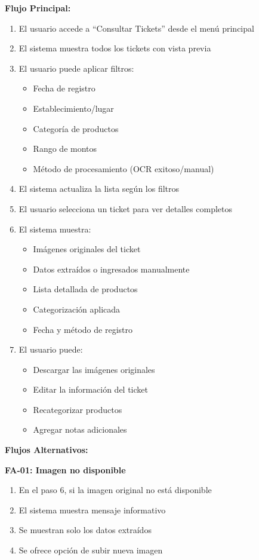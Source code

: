 \noindent\textbf{Flujo Principal:}
\begin{enumerate}
    \item El usuario accede a ``Consultar Tickets'' desde el menú principal
    \item El sistema muestra todos los tickets con vista previa
    \item El usuario puede aplicar filtros:
    \begin{itemize}
        \item Fecha de registro
        \item Establecimiento/lugar
        \item Categoría de productos
        \item Rango de montos
        \item Método de procesamiento (OCR exitoso/manual)
    \end{itemize}
    \item El sistema actualiza la lista según los filtros
    \item El usuario selecciona un ticket para ver detalles completos
    \item El sistema muestra:
    \begin{itemize}
        \item Imágenes originales del ticket
        \item Datos extraídos o ingresados manualmente
        \item Lista detallada de productos
        \item Categorización aplicada
        \item Fecha y método de registro
    \end{itemize}
    \item El usuario puede:
    \begin{itemize}
        \item Descargar las imágenes originales
        \item Editar la información del ticket
        \item Recategorizar productos
        \item Agregar notas adicionales
    \end{itemize}
\end{enumerate}

\noindent\textbf{Flujos Alternativos:}

\textbf{FA-01: Imagen no disponible}
\begin{enumerate}
    \item En el paso 6, si la imagen original no está disponible
    \item El sistema muestra mensaje informativo
    \item Se muestran solo los datos extraídos
    \item Se ofrece opción de subir nueva imagen
\end{enumerate}

